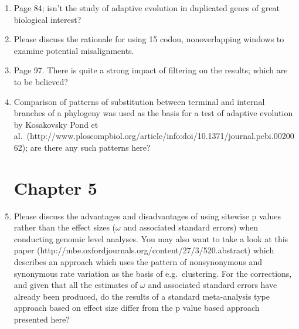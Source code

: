 \begin{enumerate}
{}

\item{ Page 84; isn't the study of adaptive evolution in duplicated genes of
great biological interest?

}

\item{ Please discuss the rationale for using 15 codon, nonoverlapping
windows to examine potential misalignments.}

\item{ Page 97. There is quite a strong impact of filtering on the results;
which are to be believed?}

\item{ Comparison of patterns of substitution between terminal and internal
branches of a phylogeny was used as the basis for a test of adaptive
evolution by Kosakovsky Pond et al.\
(http://www.ploscompbiol.org/article/info:doi/10.1371/journal.pcbi.0020062);
are there any such patterns here?}

\section{Chapter 5}

\item{ Please discuss the advantages and disadvantages of using sitewise p
values rather than the effect sizes ($\omega$ and associated standard
errors) when conducting genomic level analyses. You may also want to
take a look at this paper
(http://mbe.oxfordjournals.org/content/27/3/520.abstract) which
describes an approach which uses the pattern of nonsynonymous and
synonymous rate variation as the basis of e.g.\ clustering. For the
corrections, and given that all the estimates of $\omega$ and associated
standard errors have already been produced, do the results of a
standard meta-analysis type approach based on effect size differ from
the p value based approach presented here?}


\end{enumerate}
